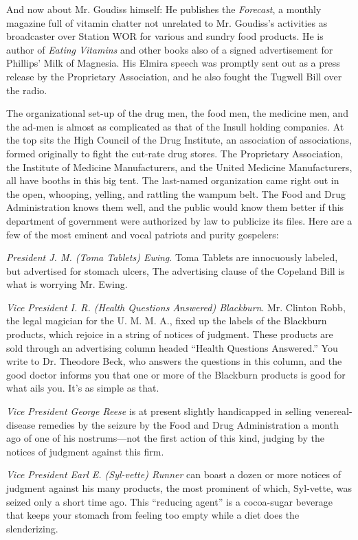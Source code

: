 \documentclass[nohyper,openany,nobib]{tufte-book}
\begin{document}
And now about Mr. Goudiss himself: He publishes the \emph{Forecast}, a
monthly magazine full of vitamin chatter not unrelated to Mr. Goudiss's
activities as broadcaster over Station WOR for various and sundry food
products. He is author of \emph{Eating Vitamins} and other books also of
a signed advertisement for Phillips' Milk of Magnesia. His Elmira speech
was promptly sent out as a press release by the Proprietary Association,
and he also fought the Tugwell Bill over the radio.

The organizational set-up of the drug men, the food men, the medicine
men, and the ad-men is almost as complicated as that of the Insull
holding companies. At the top sits the High Council of the Drug
Institute, an association of associations, formed originally to fight
the cut-rate drug stores. The Proprietary Association, the Institute of
Medicine Manufacturers, and the United Medicine Manufacturers, all have
booths in this big tent. The last-named organization came right out in
the open, whooping, yelling, and rattling the wampum belt. The Food and
Drug Administration knows them well, and the public would know them
better if this department of government were authorized by law to
publicize its files. Here are a few of the most eminent and vocal
patriots and purity gospelers:

\emph{President J. M. (Toma Tablets) Ewing}. Toma Tablets are
innocuously labeled, but advertised for stomach ulcers, The advertising
clause of the Copeland Bill is what is worrying Mr. Ewing.

\emph{Vice President I. R. (Health Questions Answered) Blackburn}. Mr.
Clinton Robb, the legal magician for the U. M. M. A., fixed up the
labels of the Blackburn products, which rejoice in a string of notices
of judgment. These products are sold through an advertising column
headed ``Health Questions Answered.'' You write to Dr. Theodore Beck,
who answers the questions in this column, and the good doctor informs
you that one or more of the Blackburn products is good for what ails
you. It's as simple as that.

\emph{Vice President George Reese} is at present slightly handicapped in
selling venereal-disease remedies by the seizure by the Food and Drug
Administration a month ago of one of his nostrums---not the first action
of this kind, judging by the notices of judgment against this firm.

\emph{Vice President Earl E. (Syl-vette) Runner} can boast a dozen or
more notices of judgment against his many products, the most prominent
of which, Syl-vette, was seized only a short time ago. This ``reducing
agent'' is a cocoa-sugar beverage that keeps your stomach from feeling
too empty while a diet does the slenderizing.
\end{document}
